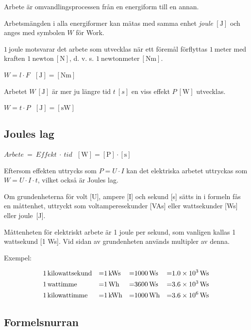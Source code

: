 Arbete är omvandlingsprocessen från en energiform till en annan.

Arbetsmängden i alla energiformer kan mätas med samma enhet \emph{joule}
\(\mathrm{[J]}\) \cite{SIbrochure8} och anges med symbolen \(W\) för Work.

\(1\ \mathrm{joule}\) motsvarar det arbete som utvecklas när ett föremål
förflyttas \(1\ \mathrm{meter}\) med kraften \(1\ \mathrm{newton\ [N]}\),
d. v. s. \(1\ \mathrm{newtonmeter\ [Nm]}\).

\(W = l \cdot F \ \ \ \mathrm{[J] = [Nm]}\)

Arbetet \(W\ \mathrm{[J]}\) är mer ju längre tid \(t\ [s]\) en viss effekt
\(P\ \mathrm{[W]}\) utvecklas.

\(W = t \cdot P \ \ \ \mathrm{[J] = [sW]}\)
  
\subsection{Joules lag}

\(Arbete\ =\ Effekt\ \cdot\ tid\ \ \ \mathrm{[W]} = \mathrm{[P]} \cdot \mathrm{[s]}\)

Eftersom effekten uttrycks som \(P = U \cdot I\) kan det elektriska arbetet
uttryckas som \(W = U \cdot I \cdot t\), vilket också är Joules lag.

Om grundenheterna för volt [U], ampere [I] och
sekund [s] sätts in i formeln fås en måttenhet, uttryckt som
voltamperesekunder [VAs] eller wattsekunder [Ws] eller joule\ [J].

Måttenheten för elektriskt arbete är 1 joule per sekund, som vanligen
kallas 1 wattsekund [1 Ws].
Vid sidan av grundenheten används multipler av denna.

Exempel:

\begin{align*}
  \centering
  \num{1}\,&\mathrm{kilowattsekund} &=& \SI{1}{kWs} &=& \SI{1000}{Ws} &=& \SI{1,0d3}{Ws} \\
  \num{1}\,&\mathrm{wattimme}       &=& \SI{1}{Wh}  &=& \SI{3600}{Ws} &=& \SI{3,6d3}{Ws} \\
  \num{1}\,&\mathrm{kilowattimme}   &=& \SI{1}{kWh} &=& \SI{1000}{Wh} &=& \SI{3,6d6}{Ws} \\
\end{align*}

\subsection{Formelsnurran}

